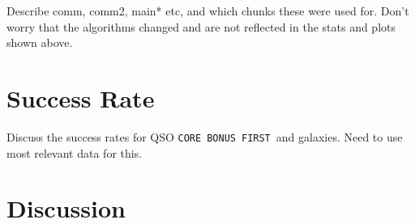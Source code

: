 \documentclass[12pt,preprint]{aastex}
\newcommand{\core}{\texttt{CORE}}
\newcommand{\bonus}{\texttt{BONUS}}
\newcommand{\first}{\texttt{FIRST}}
\begin{document}
Describe comm, comm2, main* etc, and which chunks these were used for.  Don't
worry that the algorithms changed and are not reflected in the stats and plots
shown above.

\section{Success Rate}

Discuss the success rates for QSO \core\, \bonus\, \first\ and galaxies.
Need to use most relevant data for this.

\section{Discussion}

\end{document}
